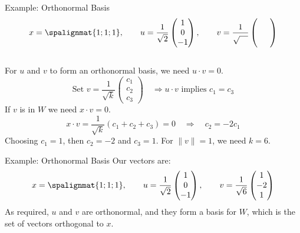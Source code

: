 \begin{frame}{Example: Orthonormal Basis}  
    \vspace{-12pt}
    \begin{equation*}
    x = \spalignmat{1;1;1}, \qquad 
    u = 
    \frac{1}{\sqrt{2}}
    \begin{pmatrix}
        1 \\ 0 \\ -1
    \end{pmatrix} ,
    \qquad 
    v= 
    \frac{1}{\sqrt{\quad}}
    \begin{pmatrix}
        \phantom {\int\int}  \\ \phantom {\int\int}  \\ \phantom {\int\int} 
    \end{pmatrix} 
    \end{equation*}
    \pause 
    \\
    For $u$ and $v$ to form an orthonormal basis, we need $u\cdot v=0$. \pause $$ \text{Set } v=\frac{1}{\sqrt k}\begin{pmatrix} c_1\\c_2\\c_3 \end{pmatrix} \quad \Rightarrow u\cdot v \text{ implies } c_1=c_3$$ If $v$ is in $W$ we need $x\cdot v =0$. \pause 
    $$x\cdot v = \frac{1}{\sqrt{k}}(c_1+c_2+c_3)=0 \quad \Rightarrow \quad c_2 = -2c_1$$
    \pause Choosing $c_1 = 1$, then $c_2 = -2$ and $c_3=1$. \pause For $\|v\| = 1$, we need $k=6$. 
\end{frame}


\begin{frame}{Example: Orthonormal Basis}  
    Our vectors are:
    \begin{equation*}
    x = \spalignmat{1;1;1}, \qquad 
    u = 
    \frac{1}{\sqrt{2}}
    \begin{pmatrix}
        1 \\ 0 \\ -1
    \end{pmatrix} ,
    \qquad 
    v= 
    \frac{1}{\sqrt{6}}
    \begin{pmatrix}
        1 \\-2\\1
    \end{pmatrix} 
    \end{equation*}
    \pause As required, $u$ and $v$ are orthonormal, \pause and they form a basis for $W$, which is the set of vectors orthogonal to $x$. 
\end{frame}



